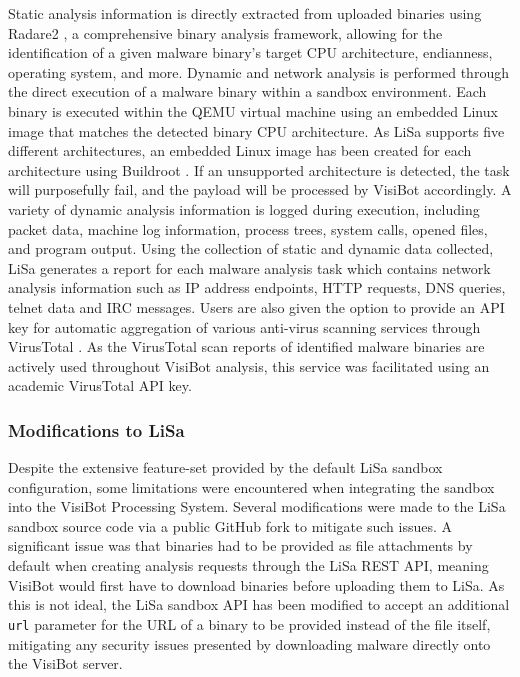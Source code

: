 Static analysis information is directly extracted from uploaded binaries using Radare2 \citep{Radare2}, a comprehensive binary analysis framework, allowing for the identification of a given malware binary's target CPU architecture, endianness, operating system, and more. Dynamic and network analysis is performed through the direct execution of a malware binary within a sandbox environment. Each binary is executed within the QEMU virtual machine \citep{Qemu} using an embedded Linux image that matches the detected binary CPU architecture. As LiSa supports five different architectures, an embedded Linux image has been created for each architecture using Buildroot \citep{Buildroot}. If an unsupported architecture is detected, the task will purposefully fail, and the payload will be processed by VisiBot accordingly. A variety of dynamic analysis information is logged during execution, including packet data, machine log information, process trees, system calls, opened files, and program output. Using the collection of static and dynamic data collected, LiSa generates a report for each malware analysis task which contains network analysis information such as IP address endpoints, HTTP requests, DNS queries, telnet data and IRC messages. Users are also given the option to provide an API key for automatic aggregation of various anti-virus scanning services through VirusTotal \citep{VirusTotal}. As the VirusTotal scan reports of identified malware binaries are actively used throughout VisiBot analysis, this service was facilitated using an academic VirusTotal API key.

\subsubsection{Modifications to LiSa}

Despite the extensive feature-set provided by the default LiSa sandbox configuration, some limitations were encountered when integrating the sandbox into the VisiBot Processing System. Several modifications were made to the LiSa sandbox source code via a public GitHub fork \citep{LiSaModified} to mitigate such issues. A significant issue was that binaries had to be provided as file attachments by default when creating analysis requests through the LiSa REST API, meaning VisiBot would first have to download binaries before uploading them to LiSa. As this is not ideal, the LiSa sandbox API has been modified to accept an additional \texttt{url} parameter for the URL of a binary to be provided instead of the file itself, mitigating any security issues presented by downloading malware directly onto the VisiBot server.

